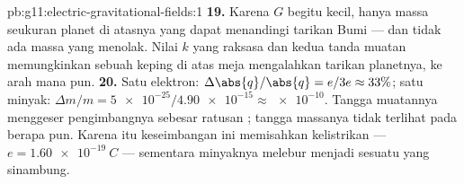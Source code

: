 \begin{solution}{pb:g11:electric-gravitational-fields:1}
\textbf{19.} Karena $G$ begitu kecil, hanya massa seukuran planet di
atasnya yang dapat menandingi tarikan Bumi --- dan tidak ada massa yang
menolak. Nilai $k$ yang raksasa dan kedua tanda muatan memungkinkan
sebuah keping di atas meja mengalahkan tarikan planetnya, ke arah mana
pun.
\textbf{20.} Satu elektron: $\Delta\abs{q}/\abs{q} = e/3e \approx 33\%$;
satu  minyak: $\Delta m/m = \num{5e-25} / \num{4.90e-15}
\approx \num{e-10}$. Tangga muatannya menggeser  pengimbangnya
sebesar ratusan ; tangga massanya tidak terlihat pada 
berapa pun. Karena itu keseimbangan ini memisahkan  kelistrikan ---
$e = \qty{1.60e-19}{C}$ --- sementara  minyaknya melebur menjadi
sesuatu yang sinambung.
\end{solution}

